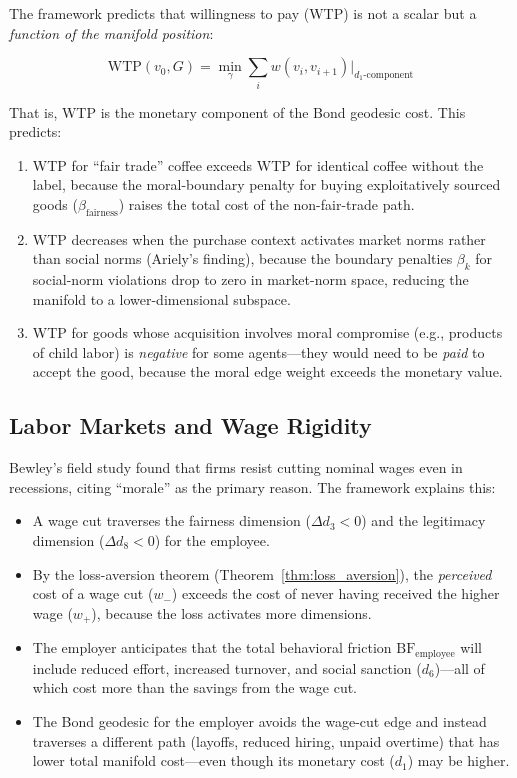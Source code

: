 \documentclass[12pt]{article}
\theoremstyle{definition}
\theoremstyle{remark}
\newcommand{\BF}{\mathrm{BF}}              %
\begin{document}
The framework predicts that willingness to pay (WTP) is not a scalar but a \emph{function of the manifold position}:

\begin{equation}
\text{WTP}(v_0, G) = \min_\gamma \sum_{i} w(v_i, v_{i+1}) \Big|_{d_1\text{-component}}
\label{eq:wtp}
\end{equation}

That is, WTP is the monetary component of the Bond geodesic cost.  This predicts:
\begin{enumerate}
    \item WTP for ``fair trade'' coffee exceeds WTP for identical coffee without the label, because the moral-boundary penalty for buying exploitatively sourced goods ($\beta_{\text{fairness}}$) raises the total cost of the non-fair-trade path.
    \item WTP decreases when the purchase context activates market norms rather than social norms (Ariely's finding), because the boundary penalties $\beta_k$ for social-norm violations drop to zero in market-norm space, reducing the manifold to a lower-dimensional subspace.
    \item WTP for goods whose acquisition involves moral compromise (e.g., products of child labor) is \emph{negative} for some agents---they would need to be \emph{paid} to accept the good, because the moral edge weight exceeds the monetary value.
\end{enumerate}

\subsection{Labor Markets and Wage Rigidity}

Bewley's \cite{bewley1999} field study found that firms resist cutting nominal wages even in recessions, citing ``morale'' as the primary reason.  The framework explains this:

\begin{itemize}
    \item A wage cut traverses the fairness dimension ($\Delta d_3 < 0$) and the legitimacy dimension ($\Delta d_8 < 0$) for the employee.
    \item By the loss-aversion theorem (Theorem~\ref{thm:loss_aversion}), the \emph{perceived} cost of a wage cut ($w_-$) exceeds the cost of never having received the higher wage ($w_+$), because the loss activates more dimensions.
    \item The employer anticipates that the total behavioral friction $\BF_{\text{employee}}$ will include reduced effort, increased turnover, and social sanction ($d_6$)---all of which cost more than the savings from the wage cut.
    \item The Bond geodesic for the employer avoids the wage-cut edge and instead traverses a different path (layoffs, reduced hiring, unpaid overtime) that has lower total manifold cost---even though its monetary cost ($d_1$) may be higher.
\end{itemize}
\end{document}
